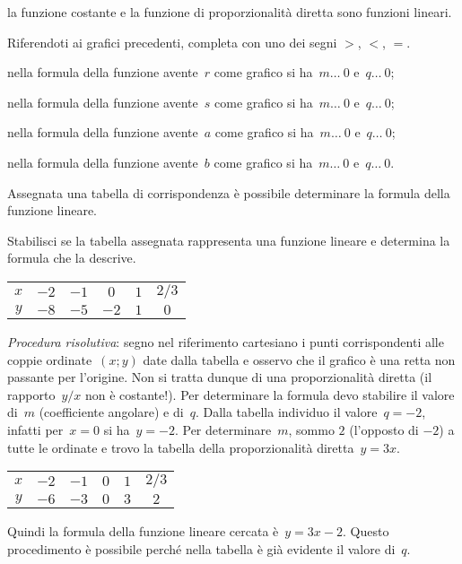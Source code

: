 \conclusione la funzione costante e la funzione di proporzionalità diretta sono funzioni lineari.

\begin{exrig}
 \begin{esempio}
Riferendoti ai grafici precedenti, completa con uno dei segni $>$, $<$, $=$.
\begin{itemize*}
\item nella formula della funzione avente~$r$ come grafico si ha~$m \ldots~0$ e~$q \ldots~0$;
\item nella formula della funzione avente~$s$ come grafico si ha~$m \ldots~0$ e~$q \ldots~0$;
\item nella formula della funzione avente~$a$ come grafico si ha~$m \ldots~0$ e~$q \ldots~0$;
\item nella formula della funzione avente~$b$ come grafico si ha~$m \ldots~0$ e~$q \ldots~0$.
\end{itemize*}
 \end{esempio}
\end{exrig}
Assegnata una tabella di corrispondenza è possibile determinare la formula della funzione lineare.
\begin{exrig}
 \begin{esempio}
Stabilisci se la tabella assegnata rappresenta una funzione lineare e determina la formula che la descrive.
\begin{center}
 \begin{tabular}{cccccc}
 \toprule
 $x$ & $-2$ & $-1$ & $0$ & $1$ & $2/3$\\
 $y$ & $-8$ & $-5$ & $-2$ & $1$ & $0$\\
 \bottomrule
 \end{tabular}
\end{center}

\emph{Procedura risolutiva}: segno nel riferimento cartesiano i punti corrispondenti alle coppie ordinate~$(x;y)$
date dalla tabella e osservo che il grafico è una retta non passante per l'origine. Non si tratta dunque di una
proporzionalità diretta (il rapporto~$y/x$ non è costante!). Per determinare la formula devo stabilire
il valore di~$m$ (coefficiente angolare) e di~$q$.
Dalla tabella individuo il valore~$q=-2$, infatti per~$x=0$ si ha~$y=-2$. Per determinare~$m$, sommo
$2$ (l'opposto di $-2$) a tutte le ordinate e trovo la tabella della proporzionalità diretta~$y=3x$.
\begin{center}
 \begin{tabular}{cccccc}
 \toprule
 $x$ & $-2$ & $-1$ & $0$ & $1$ & $2/3$\\
 $y$ & $-6$ & $-3$ & $0$ & $3$ & $2$\\
 \bottomrule
 \end{tabular}
\end{center}
Quindi la formula della funzione lineare cercata è~$y=3x-2$.
Questo procedimento è possibile perché nella tabella è già evidente il valore di~$q$.
 \end{esempio}
\end{exrig}

